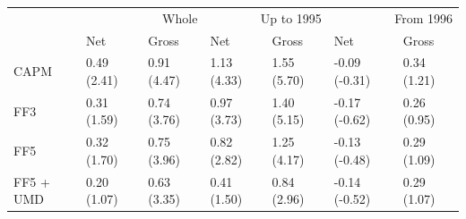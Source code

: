 \begin{tabular}{lllllll}
\toprule
 & \multicolumn{2}{r}{Whole} & \multicolumn{2}{r}{Up to 1995} & \multicolumn{2}{r}{From 1996} \\
 & Net & Gross & Net & Gross & Net & Gross \\
\midrule
CAPM & 0.49 (2.41) & 0.91 (4.47) & 1.13 (4.33) & 1.55 (5.70) & -0.09 (-0.31) & 0.34 (1.21) \\
FF3 & 0.31 (1.59) & 0.74 (3.76) & 0.97 (3.73) & 1.40 (5.15) & -0.17 (-0.62) & 0.26 (0.95) \\
FF5 & 0.32 (1.70) & 0.75 (3.96) & 0.82 (2.82) & 1.25 (4.17) & -0.13 (-0.48) & 0.29 (1.09) \\
FF5 + UMD & 0.20 (1.07) & 0.63 (3.35) & 0.41 (1.50) & 0.84 (2.96) & -0.14 (-0.52) & 0.29 (1.07) \\
\bottomrule
\end{tabular}
